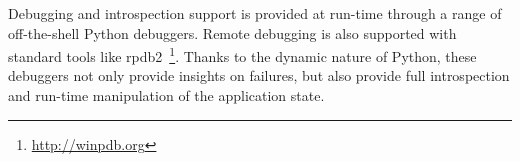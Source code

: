 \documentclass[a4paper, 10pt, conference]{ieeeconf}      %
\newcommand{\pyRobots}{\textsc{pyRobots}\ }
\begin{document}
Debugging and introspection support is provided at run-time through a range of
off-the-shell Python debuggers. Remote debugging is also supported with standard
tools like {\sc rpdb2}~\footnote{\url{http://winpdb.org}}. Thanks to the dynamic
nature of Python, these debuggers not only provide insights on failures, but
also provide full introspection and run-time manipulation of the application
state.

% 
% 
% 
% 
% 
% 
% 
% 
% 
% 
% 
% 
% 
% 
% 
% 
% 
% 
% 
% 
% 
% 
\end{document}
